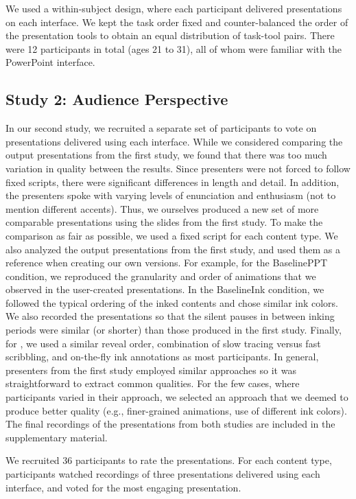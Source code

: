 We used a within-subject design, where each participant delivered presentations on each interface. We kept the task order fixed and counter-balanced the order of the presentation tools to obtain an equal distribution of task-tool pairs.
%
There were 12 participants in total (ages 21 to 31), all of whom were familiar with the PowerPoint interface. 

\subsection{Study 2: Audience Perspective}
In our second study, we recruited a separate set of participants to vote on presentations delivered using each interface.
%
While we considered comparing the output presentations from the first study, we found that there was too much variation in quality between the results. Since presenters were not forced to follow fixed scripts, there were significant differences in length and detail. In addition, the presenters spoke with varying levels of enunciation and enthusiasm (not to mention different accents).
%
Thus, we ourselves produced a new set of more comparable presentations
using the slides from the first study.
%
To make the comparison as fair as possible, we used a fixed script for each content type.
We also analyzed the output presentations from the first study, and used them as a reference when creating our own versions. 
%
For example, for the BaselinePPT condition, we reproduced the granularity and order of animations that we observed in the user-created presentations.
In the BaselineInk condition, we followed the typical ordering of the inked contents and chose similar ink colors. We also recorded the presentations so that the silent pauses in between inking periods were similar (or shorter) than those produced in the first study. 
%
Finally, for \interface, we used a similar reveal order, combination of slow tracing versus fast scribbling, and on-the-fly ink annotations as most participants. 
%
In general, presenters from the first study employed similar approaches so it was straightforward to extract common qualities. For the few cases, where participants varied in their approach, we selected an approach that we deemed to produce better quality (e.g., finer-grained animations, use of different ink colors). The final recordings of the presentations from both studies are included in the supplementary material. 

We recruited 36 participants to rate the presentations. For each content type, participants watched recordings of three presentations delivered using each interface, and voted for the most engaging presentation. 














